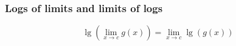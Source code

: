     \subsubsection{Logs of limits and limits of logs}
        \begin{definition}
            \begin{equation}
                \lg \left( \lim_{x \to c} g(x) \right) = \lim_{x \to c} \lg(g(x))
            \end{equation}
        \end{definition}